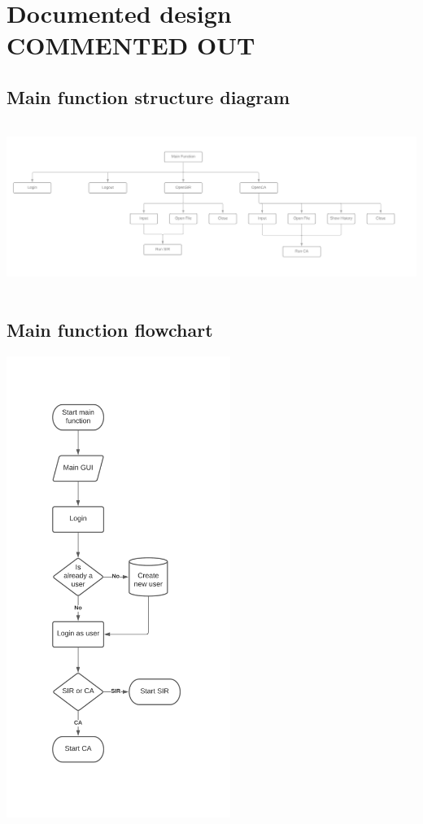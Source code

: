 \documentclass[11pt, a4paper]{article}
\begin{document}
\newpage



\newpage
\section{Documented design COMMENTED OUT}


\subsection{Main function structure diagram}
\includegraphics[height=5.43cm, width=\textwidth]{s_main_function.png}
\subsection{Main function flowchart}
\includegraphics[height=15cm]{f_main.png}
\newpage
\end{document}
